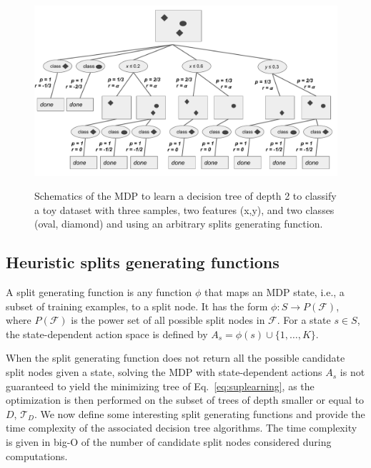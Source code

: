 \begin{figure}
      \centering
      \includegraphics[width=0.9\linewidth]{images/figures/schema_mdp.pdf}
      \caption{Schematics of the MDP to learn a decision tree of depth 2 to classify a toy dataset with three samples, two features (x,y), and two classes (oval, diamond) and using an arbitrary splits generating function.}
      \label{fig:schema-mdp}
\end{figure}

\subsection{Heuristic splits generating functions}\label{sec:testgen}

A split generating function is any function $\phi$ that maps an MDP state, i.e., a subset of training examples, to a split node. It has the form $\phi: S \rightarrow P(\mathcal{F})$, where $P(\mathcal{F})$ is the power set of all possible split nodes in $\mathcal F$. 
For a state $s \in S$, the state-dependent action space is defined by $A_s = \phi(s) \cup  \{1,\ldots,K\}$. 

When the split generating function does not return all the possible candidate split nodes given a state, solving the MDP with state-dependent actions $A_s$ is not guaranteed to yield the minimizing tree of Eq.~\ref{eq:suplearning}, as the 
optimization is then performed on the subset of trees of depth smaller or equal to $D$, $\mathcal{T}_D$. 
We now define some interesting split generating functions and provide the time complexity of the associated decision tree algorithms. The time complexity is given in big-O of the number of candidate split nodes considered during computations. 

